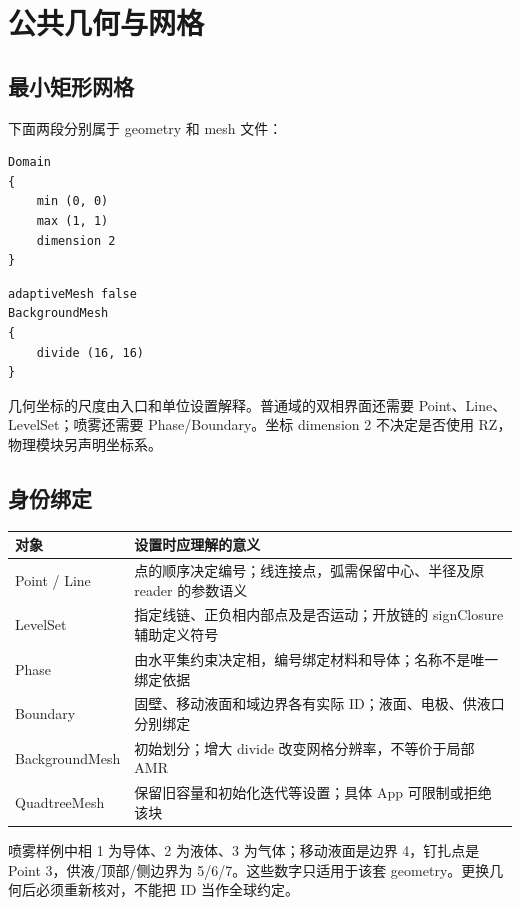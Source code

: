 \documentclass[a4paper,11pt]{article}
\begin{document}
\section{公共几何与网格}
\subsection{最小矩形网格}
下面两段分别属于 geometry 和 mesh 文件：
\begin{lstlisting}
Domain
{
    min (0, 0)
    max (1, 1)
    dimension 2
}
\end{lstlisting}
\begin{lstlisting}
adaptiveMesh false
BackgroundMesh
{
    divide (16, 16)
}
\end{lstlisting}
几何坐标的尺度由入口和单位设置解释。普通域的双相界面还需要 Point、Line、LevelSet；喷雾还需要 Phase/Boundary。坐标 dimension 2 不决定是否使用 RZ，物理模块另声明坐标系。

\subsection{身份绑定}
\begin{longtable}{L{.25\linewidth}L{.67\linewidth}}
\toprule 对象 & 设置时应理解的意义 \\\midrule\endhead
Point / Line & 点的顺序决定编号；线连接点，弧需保留中心、半径及原 reader 的参数语义 \\
LevelSet & 指定线链、正负相内部点及是否运动；开放链的 signClosure 辅助定义符号 \\
Phase & 由水平集约束决定相，编号绑定材料和导体；名称不是唯一绑定依据 \\
Boundary & 固壁、移动液面和域边界各有实际 ID；液面、电极、供液口分别绑定 \\
BackgroundMesh & 初始划分；增大 divide 改变网格分辨率，不等价于局部 AMR \\
QuadtreeMesh & 保留旧容量和初始化迭代等设置；具体 App 可限制或拒绝该块 \\
\bottomrule
\end{longtable}
喷雾样例中相 1 为导体、2 为液体、3 为气体；移动液面是边界 4，钉扎点是 Point 3，供液/顶部/侧边界为 5/6/7。这些数字只适用于该套 geometry。更换几何后必须重新核对，不能把 ID 当作全球约定。
\end{document}
